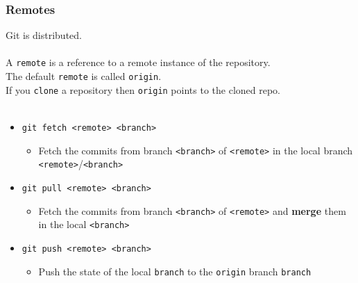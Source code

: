 \documentclass{beamer}
\begin{document}
\begin{frame}
    \frametitle{Remotes}
    Git is distributed. \\
    \hfill \\
    A \texttt{remote} is a reference to a remote instance of the repository.\\
    The default \texttt{remote} is called \texttt{origin}.\\
    If you \texttt{clone} a repository then \texttt{origin} points to the cloned repo.\\
    \hfill \\
    \begin{itemize}
        \item \texttt{git fetch <remote> <branch>}
        \begin{itemize}
            \item Fetch the commits from branch \texttt{<branch>} of \texttt{<remote>} in the local branch \texttt{<remote>}/\texttt{<branch>}
        \end{itemize}
        \item \texttt{git pull <remote> <branch>}
        \begin{itemize}
            \item Fetch the commits from branch \texttt{<branch>} of \texttt{<remote>} and \textbf{merge} them in the local \texttt{<branch>}
        \end{itemize}
        \item \texttt{git push <remote> <branch>}
        \begin{itemize}
            \item Push the state of the local \texttt{branch} to the \texttt{origin} branch \texttt{branch} 
        \end{itemize}
    \end{itemize}
\end{frame}
\end{document}
